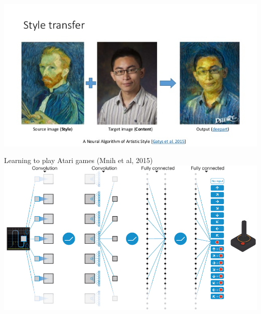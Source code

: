 \begin{frame}
	\includegraphics[width=\textwidth]{style_transfer}
\end{frame}

\begin{frame}{Learning to play Atari games (Mnih et al, 2015)}
	\includegraphics[width=\textwidth]{deepmind_atari}
\end{frame}

